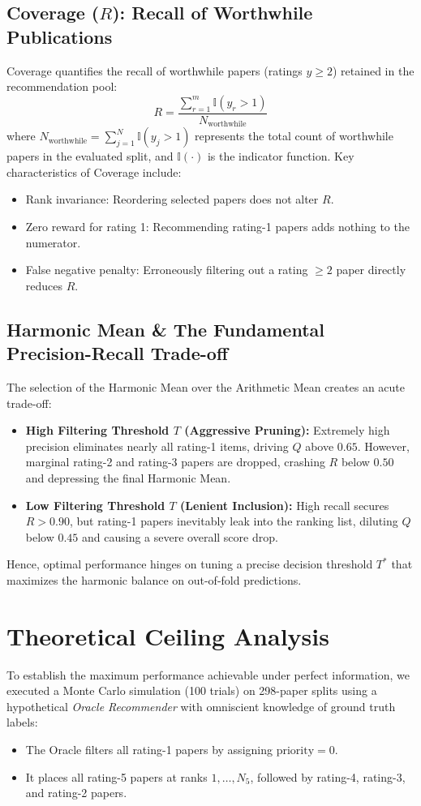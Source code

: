 \subsection{Coverage ($R$): Recall of Worthwhile Publications}
Coverage quantifies the recall of worthwhile papers (ratings $y \ge 2$) retained in the recommendation pool:
\begin{equation}
  R = \frac{\sum_{r=1}^m \mathbb{I}(y_r > 1)}{N_{\text{worthwhile}}}
  \label{eq:coverage}
\end{equation}
where $N_{\text{worthwhile}} = \sum_{j=1}^N \mathbb{I}(y_j > 1)$ represents the total count of worthwhile papers in the evaluated split, and $\mathbb{I}(\cdot)$ is the indicator function. Key characteristics of Coverage include:
\begin{itemize}
  \item Rank invariance: Reordering selected papers does not alter $R$.
  \item Zero reward for rating 1: Recommending rating-1 papers adds nothing to the numerator.
  \item False negative penalty: Erroneously filtering out a rating $\ge 2$ paper directly reduces $R$.
\end{itemize}

\subsection{Harmonic Mean \& The Fundamental Precision-Recall Trade-off}
The selection of the Harmonic Mean over the Arithmetic Mean creates an acute trade-off:
\begin{itemize}
  \item \textbf{High Filtering Threshold $T$ (Aggressive Pruning):} Extremely high precision eliminates nearly all rating-1 items, driving $Q$ above $0.65$. However, marginal rating-2 and rating-3 papers are dropped, crashing $R$ below $0.50$ and depressing the final Harmonic Mean.
  \item \textbf{Low Filtering Threshold $T$ (Lenient Inclusion):} High recall secures $R > 0.90$, but rating-1 papers inevitably leak into the ranking list, diluting $Q$ below $0.45$ and causing a severe overall score drop.
\end{itemize}
Hence, optimal performance hinges on tuning a precise decision threshold $T^*$ that maximizes the harmonic balance on out-of-fold predictions.

\section{Theoretical Ceiling Analysis}
To establish the maximum performance achievable under perfect information, we executed a Monte Carlo simulation (100 trials) on 298-paper splits using a hypothetical \textit{Oracle Recommender} with omniscient knowledge of ground truth labels:
\begin{itemize}
  \item The Oracle filters all rating-1 papers by assigning $\text{priority} = 0$.
  \item It places all rating-5 papers at ranks $1, \dots, N_5$, followed by rating-4, rating-3, and rating-2 papers.
\end{itemize}


